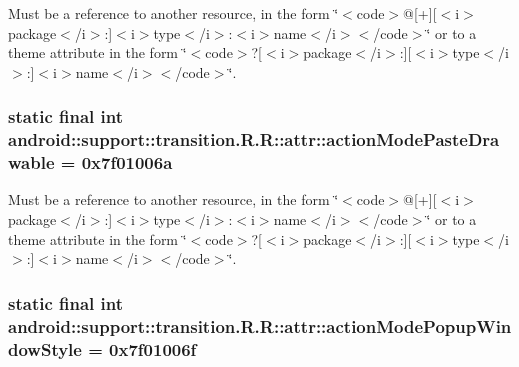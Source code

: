 Must be a reference to another resource, in the form \char`\"{}$<$code$>$@\mbox{[}+\mbox{]}\mbox{[}$<$i$>$package$<$/i$>$:\mbox{]}$<$i$>$type$<$/i$>$:$<$i$>$name$<$/i$>$$<$/code$>$\char`\"{} or to a theme attribute in the form \char`\"{}$<$code$>$?\mbox{[}$<$i$>$package$<$/i$>$:\mbox{]}\mbox{[}$<$i$>$type$<$/i$>$:\mbox{]}$<$i$>$name$<$/i$>$$<$/code$>$\char`\"{}. \hypertarget{classandroid_1_1support_1_1transition_1_1_r_1_1attr_bcd9f43e77701b906ac2b540b5c5119b}{
\subsubsection[{actionModePasteDrawable}]{\setlength{\rightskip}{0pt plus 5cm}static final int android::support::transition.R.R::attr::actionModePasteDrawable = 0x7f01006a}}
\label{classandroid_1_1support_1_1transition_1_1_r_1_1attr_bcd9f43e77701b906ac2b540b5c5119b}


Must be a reference to another resource, in the form \char`\"{}$<$code$>$@\mbox{[}+\mbox{]}\mbox{[}$<$i$>$package$<$/i$>$:\mbox{]}$<$i$>$type$<$/i$>$:$<$i$>$name$<$/i$>$$<$/code$>$\char`\"{} or to a theme attribute in the form \char`\"{}$<$code$>$?\mbox{[}$<$i$>$package$<$/i$>$:\mbox{]}\mbox{[}$<$i$>$type$<$/i$>$:\mbox{]}$<$i$>$name$<$/i$>$$<$/code$>$\char`\"{}. \hypertarget{classandroid_1_1support_1_1transition_1_1_r_1_1attr_442ef3f650ac491c05d31f539adc3ada}{
\subsubsection[{actionModePopupWindowStyle}]{\setlength{\rightskip}{0pt plus 5cm}static final int android::support::transition.R.R::attr::actionModePopupWindowStyle = 0x7f01006f}}
\label{classandroid_1_1support_1_1transition_1_1_r_1_1attr_442ef3f650ac491c05d31f539adc3ada}


